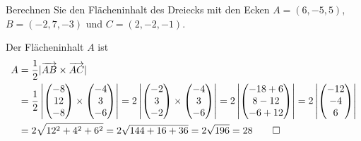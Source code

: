 Berechnen Sie den Flächeninhalt des Dreiecks mit den Ecken $A=(6,-5,5)$,
$B=(-2,7,-3)$ und $C=(2,-2,-1)$.


\begin{loesung}
Der Flächeninhalt $A$ ist
\begin{align*}
A&=\frac12|\overrightarrow{AB}\times\overrightarrow{AC}|\\
&=
\frac12\left|
\begin{pmatrix}-8\\12\\-8\end{pmatrix}
\times
\begin{pmatrix}-4\\3\\-6\end{pmatrix}
\right|
=
2\left|
\begin{pmatrix}-2\\3\\-2\end{pmatrix}
\times
\begin{pmatrix}-4\\3\\-6\end{pmatrix}
\right|
=
2\left|
\begin{pmatrix}
-18+6\\8-12\\-6+12
\end{pmatrix}
\right|
=
2\left|
\begin{pmatrix}
-12\\-4\\6
\end{pmatrix}
\right|
\\
&=
2\sqrt{12^2+4^2+6^2}
=
2\sqrt{144+16+36}=2\sqrt{196}=28
\qedhere
\end{align*}
\end{loesung}

